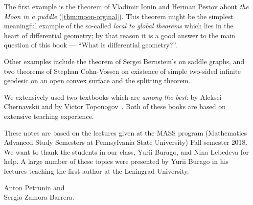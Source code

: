 The first example is the theorem of Vladimir Ionin and Herman Pestov about \emph{the Moon in a puddle} (\ref{thm:moon-orginal}).
This theorem might be the simplest meaningful example of the so-called {}\emph{local to global theorems} which lies in the heart of differential geometry;
by that reason it is a good answer to the main question of this book --- ``What is differential geometry?''.

Other examples include the theorem of Sergei Bernstein's on saddle graphs, and two theorems of Stephan Cohn-Vossen on existence of simple two-sided infinite geodesic on an open convex surface and the splitting theorem.

We extensively used two textbooks which are \emph{among the best}: by Aleksei Chernavskii \cite{chernavsky} and by Victor Toponogov~\cite{toponogov-book}.
Both of these books are based on extensive teaching experience.

These notes are based on the lectures given at the MASS program (Mathematics Advanced Study Semesters at Pennsylvania State University) Fall semester 2018.
We want to thank the students in our class, Yurii Burago, and Nina Lebedeva for help.
A large number of these topics were presented by Yurii Burago in his lectures teaching the first author at the Leningrad University.

\begin{flushright}
Anton Petrunin and\\
Sergio Zamora Barrera.
\end{flushright}




